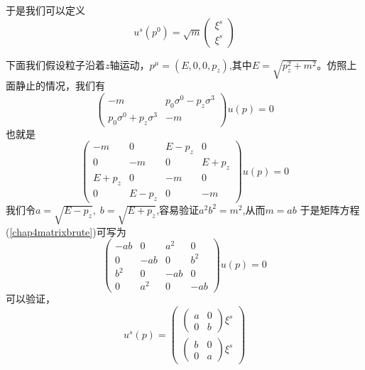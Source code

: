 于是我们可以定义
\begin{equation}
   u^{s}(p^{0})=\sqrt{m}\left( \begin{array}{cc}
        \xi^{s}   \\
          \xi^{s}
    \end{array}\right)
\end{equation}

下面我们假设粒子沿着$z$轴运动，$p^{\mu}=(E,0,0,p_{z})$,其中$E=\sqrt{p_{z}^{2}+m^{2}}$。仿照上面静止的情况，我们有
    \begin{equation}
    \label{chap4exammmm}
\left(\begin{array}{cc}
    -m &p_{0}\sigma^{0}-p_{z}\sigma^{3}  \\
     p_{0}\sigma^{0}+p_{z}\sigma^{3}& -m
\end{array}\right)u(p)=0
\end{equation}
也就是
 \begin{equation}
 \label{chap4matrixbrute}
\left(\begin{array}{cccc}
    -m& 0 &E-p_{z} &0 \\
    0& -m &0 &E+p_{z}\\
    E+p_{z}& 0 &-m &0\\
    0& E-p_{z} &0 &-m
\end{array}\right)u(p)=0
\end{equation}
我们令$a=\sqrt{E-p_{z}},\;b=\sqrt{E+p_{z}}$,容易验证$a^{2}b^{2}=m^{2}$,从而$m=ab$
于是矩阵方程(\ref{chap4matrixbrute})可写为
 \begin{equation}
 \label{chap4matrixbrute2}
\left(\begin{array}{cccc}
    -ab& 0 &a^{2} &0 \\
    0& -ab &0 &b^{2}\\
    b^{2}& 0 &-ab &0\\
    0& a^{2} &0 &-ab
\end{array}\right)u(p)=0
\end{equation}
可以验证，
\begin{equation}
    u^{s}(p)=\left(\begin{array}{cc}
         \left(\begin{array}{cc}
            a  & 0 \\
             0 & b
         \end{array}\right)\xi^{s}  \\
          \left(\begin{array}{cc}
            b  & 0 \\
             0 & a
         \end{array}\right)\xi^{s}
    \end{array}\right)
\end{equation}
